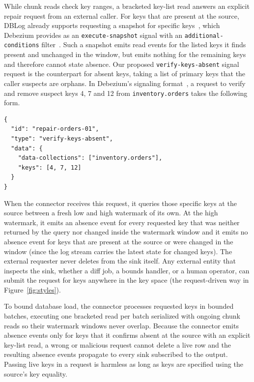 \documentclass[sigconf,nonacm,10pt]{acmart}
\begin{document}
While chunk reads check key ranges, a bracketed key-list read answers an
explicit repair request from an external caller. For keys that are present at
the source, DBLog already supports requesting a snapshot for specific
keys~\cite{andreakis2020dblog}, which Debezium provides as an
\texttt{execute-snapshot} signal with an \texttt{additional-conditions}
filter~\cite{debezium_signalling,debezium_postgresql_connector}. Such a
snapshot emits read events for the listed keys it finds present and unchanged
in the window, but emits nothing for the remaining keys and therefore cannot
state absence. Our proposed \texttt{verify-keys-absent} signal request is the
counterpart for absent keys, taking a list of primary keys that the caller
suspects are orphans.
In Debezium's signaling format~\cite{debezium_signalling}, a request to verify
and remove suspect keys 4, 7 and 12 from \texttt{inventory.orders} takes the following form.\par
\begin{footnotesize}
\begin{trivlist}\item\relax
\noindent\begin{minipage}[t]{\columnwidth}
\begin{verbatim}
{
  "id": "repair-orders-01",
  "type": "verify-keys-absent",
  "data": {
    "data-collections": ["inventory.orders"],
    "keys": [4, 7, 12]
  }
}
\end{verbatim}
\end{minipage}\par\vspace{2.85pt}
\end{trivlist}
\end{footnotesize}
When the connector receives this request, it queries those specific keys at the
source between a fresh low and high watermark of its own. At the high watermark,
it emits an absence event for every requested key that was neither returned by
the query nor changed inside the watermark window and it emits no absence event
for keys that are present at the source or were changed in the window (since the
log stream carries the latest state for changed keys). The external requester
never deletes from the sink itself. Any external entity that inspects the sink,
whether a diff job, a bounds handler, or a human operator, can submit the
request for keys anywhere in the key space (the request-driven way in 
Figure~\ref{fig:styles}).

To bound database load, the connector processes requested keys in bounded
batches, executing one bracketed read per batch serialized with ongoing chunk
reads so their watermark windows never overlap. Because the connector emits
absence events only for keys that it confirms absent at the source with an
explicit key-list read, a wrong or malicious request cannot delete a live row
and the resulting absence events propagate to every sink subscribed to the
output. Passing live keys in a request is harmless as long as keys are specified using the
source's key equality.
\end{document}

